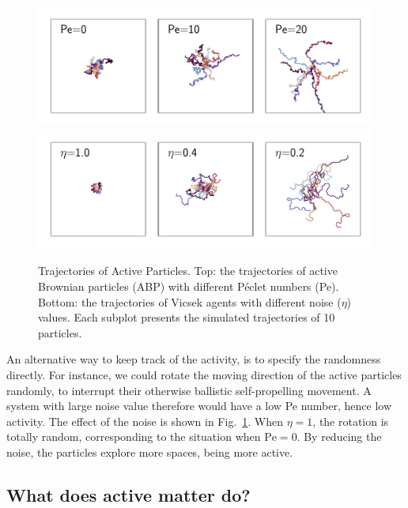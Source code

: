 \documentclass[11pt,twoside]{report}
\begin{document}
\begin{figure}
  \includegraphics[width=\linewidth]{active-trajs}
  \includegraphics[width=\linewidth]{vicsek-trajs}
  \caption[Trajectories of Active Particles]{
  Trajectories of Active Particles.
  Top: the trajectories of active Brownian particles (ABP) with different Péclet numbers (Pe).
  Bottom: the trajectories of Vicsek agents with different noise ($\eta$) values. 
  Each subplot presents the simulated trajectories of 10 particles.
  }
\label{fig:active-trajs}
\end{figure}


An alternative way to keep track of the activity, is to specify the randomness directly. For instance, we could rotate the moving direction of the active particles randomly, to interrupt their otherwise ballistic self-propelling movement. A system with large noise value therefore would have a low Pe number, hence low activity.
The effect of the noise is shown in Fig.~\ref{fig:active-trajs}. When $\eta = 1$, the rotation is totally random, corresponding to the situation when $\mathrm{Pe}=0$. By reducing the noise, the particles explore more spaces, being more active.



\subsection{What does active matter do?}
\label{section:active-phase}
\end{document}
